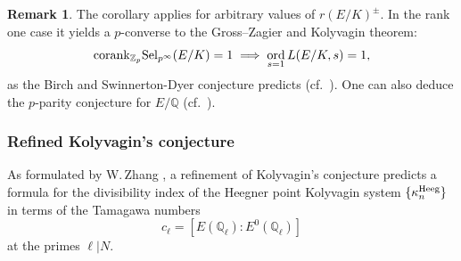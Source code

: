 \documentclass[10pt,reqno]{amsart}
\numberwithin{equation}{section}
\theoremstyle{plain}
\theoremstyle{definition}
\newtheorem*{rmk-intro}{Remark}
\theoremstyle{definition}
\theoremstyle{plain}
\theoremstyle{plain}
\theoremstyle{plain}
\theoremstyle{plain}
\theoremstyle{plain}
\theoremstyle{plain}
\DeclareMathOperator{\ord}{ord}
\newcommand{\Z}{\mathbb{Z}}
\newcommand{\Q}{\mathbb{Q}}
\begin{document}
\begin{rmk-intro} 
The corollary applies for arbitrary values of $r(E/K)^\pm$. In the rank one case 
it yields a $p$-converse to the Gross--Zagier and Kolyvagin theorem:
$$
{\rm corank}_{\Z_{p}}{\rm Sel}_{p^{\infty}}(E/K)=1 \implies \ord_{s=1}L(E/K,s)=1,
$$
as the Birch and Swinnerton-Dyer conjecture predicts (cf.~\cite[Theorem 1.3]{zhang_ind}).  One can also deduce the $p$-parity conjecture for $E/\Q$ (cf.~\cite[Theorem 1.2, Remark 1]{zhang_ind}).
\end{rmk-intro}

\subsubsection*{Refined Kolyvagin's conjecture} 

As formulated by W.\,Zhang \cite{zhang_ind}, 
a refinement of Kolyvagin's conjecture predicts a formula for the divisibility index of the Heegner point Kolyvagin system $\{\kappa_n^{\rm Heeg}\}$ in terms of the Tamagawa numbers $$c_\ell=[E(\Q_\ell):E^{0}(\Q_\ell)]$$ at the primes $\ell\vert N$. 
\end{document}
